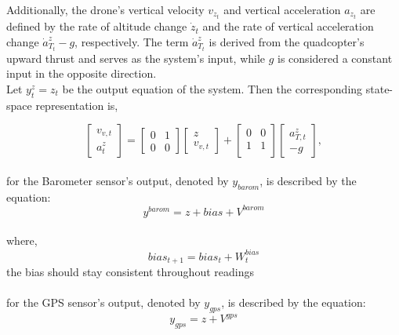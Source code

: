 \documentclass{article}
\begin{document}
\noindent
Additionally, the drone's vertical velocity \( v_{z_t} \) and vertical acceleration \( a_{z_t} \) are defined by the rate of altitude change \( \dot{z}_t \) and the rate of vertical acceleration change \( \dot{a}^z_{T_t} - g \), respectively. The term \( \dot{a}^z_{T_t} \) is derived from the quadcopter's upward thrust and serves as the system's input, while \( g \) is considered a constant input in the opposite direction.
\\

\noindent
Let \( y_{t}^z = z_t \) be the output equation of the system. Then the corresponding state-space representation is,

\begin{equation}
\begin{bmatrix}
v_{v,t}\\
a_{t}^z
\end{bmatrix} =
\begin{bmatrix}
0 & 1 \\
0 & 0 
\end{bmatrix}
\begin{bmatrix}
z\\
v_{v,t}
\end{bmatrix} + 
\begin{bmatrix}
0 & 0 \\
1 & 1 \\ 
\end{bmatrix}
\begin{bmatrix}
a_{T,t}^z \\ 
-g
\end{bmatrix},
\end{equation}
\\

\noindent
for the Barometer sensor's output, denoted by \( y_{barom} \), is described by the equation:
\begin{equation}
y^{barom} = z + bias + V^{barom}
\end{equation}
\\
where, 
\begin{equation}
bias_{t+1} = bias_t + W_{t}^{bias}
\end{equation}
the bias should stay consistent throughout readings 
\\
\\ 


\noindent
for the GPS sensor's output, denoted by \( y_{gps} \), is described by the equation:
\begin{equation}
y_{gps} = z + V^{gps}
\end{equation}
\end{document}
